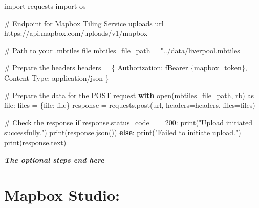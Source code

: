 \documentclass[
  letterpaper,
  DIV=11,
  numbers=noendperiod]{scrreprt}
\newenvironment{Shaded}{\begin{snugshade}}{\end{snugshade}}
\newcommand{\BuiltInTok}[1]{\textcolor[rgb]{0.00,0.23,0.31}{#1}}
\newcommand{\CommentTok}[1]{\textcolor[rgb]{0.37,0.37,0.37}{#1}}
\newcommand{\ControlFlowTok}[1]{\textcolor[rgb]{0.00,0.23,0.31}{\textbf{#1}}}
\newcommand{\DecValTok}[1]{\textcolor[rgb]{0.68,0.00,0.00}{#1}}
\newcommand{\ErrorTok}[1]{\textcolor[rgb]{0.68,0.00,0.00}{#1}}
\newcommand{\ImportTok}[1]{\textcolor[rgb]{0.00,0.46,0.62}{#1}}
\newcommand{\NormalTok}[1]{\textcolor[rgb]{0.00,0.23,0.31}{#1}}
\newcommand{\OperatorTok}[1]{\textcolor[rgb]{0.37,0.37,0.37}{#1}}
\newcommand{\SpecialCharTok}[1]{\textcolor[rgb]{0.37,0.37,0.37}{#1}}
\newcommand{\SpecialStringTok}[1]{\textcolor[rgb]{0.13,0.47,0.30}{#1}}
\newcommand{\StringTok}[1]{\textcolor[rgb]{0.13,0.47,0.30}{#1}}
\begin{document}
\begin{Shaded}
\begin{Highlighting}[]
\ImportTok{import}\NormalTok{ requests}
\ImportTok{import}\NormalTok{ os}

\CommentTok{\# Endpoint for Mapbox Tiling Service uploads}
\NormalTok{url }\OperatorTok{=} \StringTok{\textquotesingle{}https://api.mapbox.com/uploads/v1/mapbox\textquotesingle{}}

\CommentTok{\# Path to your .mbtiles file}
\NormalTok{mbtiles\_file\_path }\OperatorTok{=} \StringTok{"../data/liverpool.mbtiles\textquotesingle{}}

\ErrorTok{\# Prepare the headers}
\NormalTok{headers }\OperatorTok{=}\NormalTok{ \{}
    \StringTok{\textquotesingle{}Authorization\textquotesingle{}}\NormalTok{: }\SpecialStringTok{f\textquotesingle{}Bearer }\SpecialCharTok{\{}\NormalTok{mapbox\_token}\SpecialCharTok{\}}\SpecialStringTok{\textquotesingle{}}\NormalTok{,}
    \StringTok{\textquotesingle{}Content{-}Type\textquotesingle{}}\NormalTok{: }\StringTok{\textquotesingle{}application/json\textquotesingle{}}
\NormalTok{\}}

\CommentTok{\# Prepare the data for the POST request}
\ControlFlowTok{with} \BuiltInTok{open}\NormalTok{(mbtiles\_file\_path, }\StringTok{\textquotesingle{}rb\textquotesingle{}}\NormalTok{) }\ImportTok{as} \BuiltInTok{file}\NormalTok{:}
\NormalTok{    files }\OperatorTok{=}\NormalTok{ \{}\StringTok{\textquotesingle{}file\textquotesingle{}}\NormalTok{: }\BuiltInTok{file}\NormalTok{\}}
\NormalTok{    response }\OperatorTok{=}\NormalTok{ requests.post(url, headers}\OperatorTok{=}\NormalTok{headers, files}\OperatorTok{=}\NormalTok{files)}

\CommentTok{\# Check the response}
\ControlFlowTok{if}\NormalTok{ response.status\_code }\OperatorTok{==} \DecValTok{200}\NormalTok{:}
    \BuiltInTok{print}\NormalTok{(}\StringTok{"Upload initiated successfully."}\NormalTok{)}
    \BuiltInTok{print}\NormalTok{(response.json())}
\ControlFlowTok{else}\NormalTok{:}
    \BuiltInTok{print}\NormalTok{(}\StringTok{"Failed to initiate upload."}\NormalTok{)}
    \BuiltInTok{print}\NormalTok{(response.text)}
\end{Highlighting}
\end{Shaded}

\hfill\break
\textbf{\emph{The optional steps end here}}

\section{Mapbox Studio:}\label{mapbox-studio}
\end{document}
